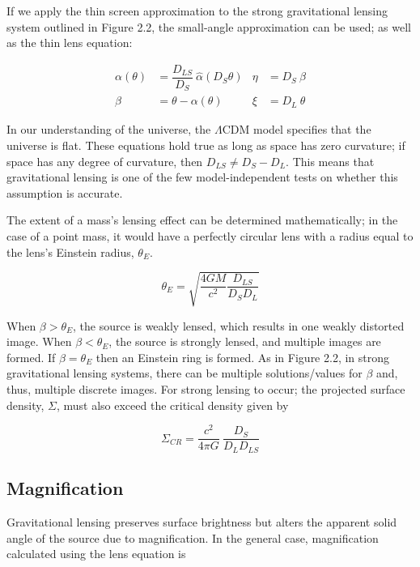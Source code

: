 \documentclass[12pt]{report}
\begin{document}
If we apply the thin screen approximation to the strong gravitational lensing system outlined in Figure 2.2, the small-angle approximation can be used; as well as the thin lens equation:

\begin{align*}
    \alpha(\theta) &= \dfrac{D_{LS}}{D_{S}} \ \hat{\alpha}(D_{S}\theta) & \eta &= D_{S} \ \beta \\
    \beta &= \theta - \alpha(\theta) & \xi &= D_{L} \ \theta
\end{align*}

\newpage


In our understanding of the universe, the $\Lambda$CDM model specifies that the universe is flat. These equations hold true as long as space has zero curvature; if space has any degree of curvature, then $D_{LS} \neq D_{S} - D_{L}$. This means that gravitational lensing is one of the few model-independent tests on whether this assumption is accurate. 

The extent of a mass's lensing effect can be determined mathematically; in the case of a point mass, it would have a perfectly circular lens with a radius equal to the lens's Einstein radius, $\theta_{E}$. 

\begin{equation*}
    \theta_{E} = \sqrt{\dfrac{4GM}{c^{2}} \dfrac{D_{LS}}{D_{S}D_{L}}}
\end{equation*}

When $\beta > \theta_{E}$, the source is weakly lensed, which results in one weakly distorted image. When $\beta < \theta_{E}$, the source is strongly lensed, and multiple images are formed. If $\beta = \theta_{E}$ then an Einstein ring is formed. As in Figure 2.2, in strong gravitational lensing systems, there can be multiple solutions/values for $\beta$ and, thus, multiple discrete images. For strong lensing to occur; the projected surface density, $\Sigma$, must also exceed the critical density given by

\begin{equation*}
    \Sigma_{CR} = \dfrac{c^{2}}{4\pi G} \ \dfrac{D_{S}}{D_{L}D_{LS}}
\end{equation*}

\subsection{Magnification}

Gravitational lensing preserves surface brightness but alters the apparent solid angle of the source due to magnification. In the general case, magnification calculated using the lens equation is
\end{document}
